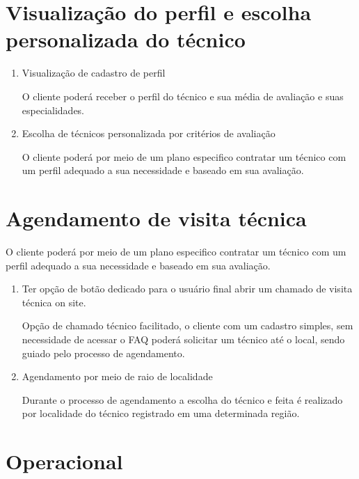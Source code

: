 \documentclass[
    12pt,               %
    openright,          %
    oneside,
    a4paper,            %
    MODELO,             %
    english,            %
    brazil              %
   ]{ifsp-spo-inf-ctds}
\begin{document}
\section{Visualização do perfil e escolha personalizada do técnico}

	\begin{enumerate}
		
		\item
		Visualização de cadastro de perfil
		
		O cliente poderá receber o perfil do técnico e sua média de avaliação e suas especialidades.
		
		\item
		Escolha de técnicos personalizada por critérios de avaliação
		
		O cliente poderá por meio de um plano especifico contratar um técnico com um perfil adequado a sua necessidade e baseado em sua avaliação.
		
	\end{enumerate}

\section{Agendamento de visita técnica}

	O cliente poderá por meio de um plano especifico contratar um técnico com um perfil adequado a sua necessidade e baseado em sua avaliação.

	\begin{enumerate}
	
	     \item
	     Ter opção de botão dedicado para o usuário final abrir um chamado de visita técnica on site.
	     
	     Opção de chamado técnico facilitado, o cliente com um cadastro simples, sem necessidade de acessar o FAQ poderá solicitar um técnico até o local, sendo guiado pelo processo de agendamento.
	     
	     \item
	     Agendamento por meio de raio de localidade
	     
	     Durante o processo de agendamento a escolha do técnico e feita é realizado por localidade do técnico registrado em uma determinada região.
	        
	\end{enumerate}

\section{Operacional}
\end{document}
